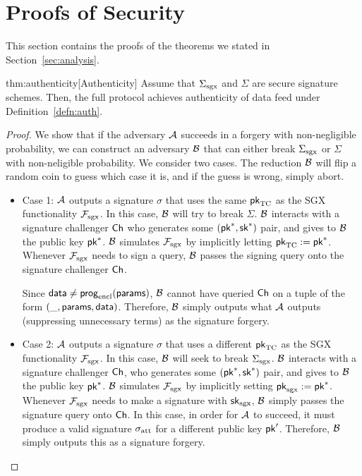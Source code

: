 
\section{Proofs of Security}
\label{sec:analysis-proofs}

This section contains the proofs of the theorems we stated in Section~\ref{sec:analysis}.


\begin{retheorem}{thm:authenticity}[Authenticity]
Assume that ${\Sigma_{\textrm{sgx}}}$ and $\Sigma$ are secure signature schemes.
Then, the full \tc protocol achieves authenticity of data feed under Definition~\ref{defn:auth}.
\end{retheorem}

\begin{proof}
We show that if the 
adversary $\mathcal{A}$ succeeds in a forgery with non-negligible probability,
we can construct an adversary $\mathcal{B}$ that can either
break ${\Sigma_{\textrm{sgx}}}$ or $\Sigma$ with non-neligible probability.
We consider two cases. 
The reduction $\mathcal{B}$ will flip a random coin to guess which
case it is, and if the guess is wrong, simply abort.
\begin{itemize}[leftmargin=5mm]
\item
Case 1: $\mathcal{A}$ outputs a signature $\sigma$ that uses the same  
${\sf pk}_{\textrm{TC}}$ as the SGX functionality $\mathcal{F}_{\textrm{sgx}}$.
In this case, $\mathcal{B}$ will try to break $\Sigma$. 
$\mathcal{B}$ interacts with a signature challenger ${\sf Ch}$ who generates
some $({\sf pk}^*, {\sf sk}^*)$ pair, and gives to $\mathcal{B}$ the public key
${\sf pk}^*$. $\mathcal{B}$ simulates 
$\mathcal{F}_{\textrm{sgx}}$ by implicitly letting ${\sf pk}_{\textrm{TC}} := {\sf pk}^*$.
Whenever $\mathcal{F}_{\textrm{sgx}}$ needs to sign a query, $\mathcal{B}$ passes the signing query
onto the signature challenger ${\sf Ch}$.

Since ${\sf data} \neq {\sf prog}_{\textrm{encl}}({\sf params})$,
$\mathcal{B}$ cannot have queried ${\sf Ch}$  
on a tuple of the form $(\_, {\sf params}, {\sf data})$. 
Therefore, $\mathcal{B}$ simply outputs 
what $\mathcal{A}$ 
outputs (suppressing unnecessary terms) as the signature forgery. 

\item
Case 2:
 $\mathcal{A}$ outputs a signature $\sigma$ that uses a different 
${\sf pk}_{\textrm{TC}}$ as the SGX functionality $\mathcal{F}_{\textrm{sgx}}$.
In this case, $\mathcal{B}$ will seek to break ${\Sigma_{\textrm{sgx}}}$.
$\mathcal{B}$ interacts with a signature challenger ${\sf Ch}$, who generates
some $({\sf pk}^*, {\sf sk}^*)$ pair, and gives to $\mathcal{B}$ the public key
${\sf pk}^*$. $\mathcal{B}$ simulates $\mathcal{F}_{\textrm{sgx}}$ by implicitly setting
${\sf pk}_{\mathrm{sgx}} := {\sf pk}^*$.
Whenever $\mathcal{F}_{\textrm{sgx}}$ needs to make a signature
with ${\sf sk}_{\mathrm{sgx}}$, 
$\mathcal{B}$ simply passes the signature query onto ${\sf Ch}$.
In this case, in order for $\mathcal{A}$ to succeed,
it must produce a valid signature ${\sigma_{\textrm{att}}}$ 
for a different public key ${\sf pk}'$.
Therefore, $\mathcal{B}$ simply outputs this as a signature forgery.
\end{itemize}
\end{proof}





